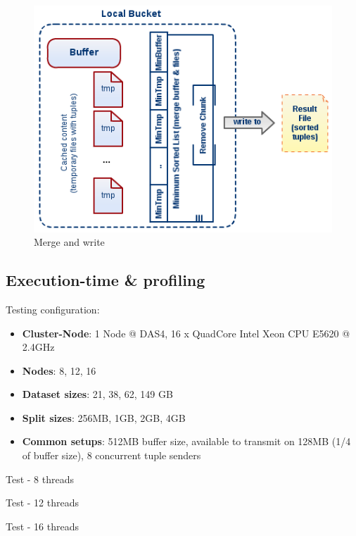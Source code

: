 \begin{figure}
\centering
\includegraphics[scale=0.6]{diag3}
\caption{Merge and write}
\label{fig:diag3}
\end{figure}

\pagebreak

% 
\subsection{Execution-time \& profiling}

Testing configuration: 
\begin{itemize}
	\item \textbf{Cluster-Node}: 1 Node @ DAS4, 16 x QuadCore Intel Xeon CPU E5620 @ 2.4GHz 
	\item \textbf{Nodes}: 8, 12, 16
	\item \textbf{Dataset sizes}: 21, 38, 62, 149 GB
	\item \textbf{Split sizes}: 256MB, 1GB, 2GB, 4GB
	\item \textbf{Common setups}: 512MB buffer size, available to transmit on 128MB (1/4 of buffer size), 8 concurrent tuple senders
\end{itemize}

Test - 8 threads
\newline \newline
\renewcommand{\arraystretch}{1.2}
{\footnotesize\tt

}

Test - 12 threads
\newline \newline
\renewcommand{\arraystretch}{1.2}
{\footnotesize\tt

}

Test - 16 threads
\newline \newline
\renewcommand{\arraystretch}{1.2}
{\footnotesize\tt

}

